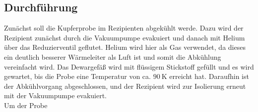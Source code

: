 \subsection{Durchführung}
\label{sec:durchführung}

Zunächst soll die Kupferprobe im Rezipienten abgekühlt werde.
Dazu wird der Rezipient zunächst durch die Vakuumpumpe evakuiert und danach mit Helium über das Reduzierventil geflutet.
Helium wird hier als Gas verwendet, da dieses ein deutlich besserer Wärmeleiter als Luft ist und somit die Abkühlung vereinfacht wird.
Das Dewargefäß wird mit flüssigem Stickstoff gefüllt und es wird gewartet, bis die Probe eine Temperatur von ca. $\SI{90}{\kelvin}$ erreicht hat.
Daraufhin ist der Abkühlvorgang abgeschlossen, und der Rezipient wird zur Isolierung erneut mit der Vakuumpumpe evakuiert.\\

Um der Probe
